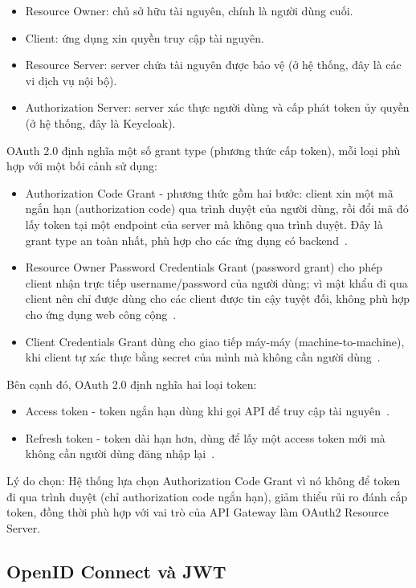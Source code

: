 \documentclass[../BTL.tex]{subfiles}
\begin{document}
\begin{itemize}
    \item Resource Owner: chủ sở hữu tài nguyên, chính là người dùng cuối.
    \item Client: ứng dụng xin quyền truy cập tài nguyên.
    \item Resource Server: server chứa tài nguyên được bảo vệ (ở hệ thống, đây là các vi dịch vụ nội bộ).
    \item Authorization Server: server xác thực người dùng và cấp phát token ủy quyền (ở hệ thống, đây là Keycloak).
\end{itemize}

OAuth 2.0 định nghĩa một số grant type (phương thức cấp token), mỗi loại phù hợp với một bối cảnh sử dụng:
\begin{itemize}
    \item Authorization Code Grant - phương thức gồm hai bước: client xin một mã ngắn hạn (authorization code) qua trình duyệt của người dùng, rồi đổi mã đó lấy token tại một endpoint của server mà không qua trình duyệt. Đây là grant type an toàn nhất, phù hợp cho các ứng dụng có backend~\cite{rfc6749}.
    \item Resource Owner Password Credentials Grant (password grant) cho phép client nhận trực tiếp username/password của người dùng; vì mật khẩu đi qua client nên chỉ được dùng cho các client được tin cậy tuyệt đối, không phù hợp cho ứng dụng web công cộng~\cite{rfc6749}.
    \item Client Credentials Grant dùng cho giao tiếp máy-máy (machine-to-machine), khi client tự xác thực bằng secret của mình mà không cần người dùng~\cite{rfc6749}.
\end{itemize}

Bên cạnh đó, OAuth 2.0 định nghĩa hai loại token:
\begin{itemize}
    \item Access token - token ngắn hạn dùng khi gọi API để truy cập tài nguyên~\cite{rfc6749}.
    \item Refresh token - token dài hạn hơn, dùng để lấy một access token mới mà không cần người dùng đăng nhập lại~\cite{rfc6749}.
\end{itemize}

Lý do chọn: Hệ thống lựa chọn Authorization Code Grant vì nó không để token đi qua trình duyệt (chỉ authorization code ngắn hạn), giảm thiểu rủi ro đánh cắp token, đồng thời phù hợp với vai trò của API Gateway làm OAuth2 Resource Server.

\subsection{OpenID Connect và JWT}
\label{section:1.8.3}
\end{document}
